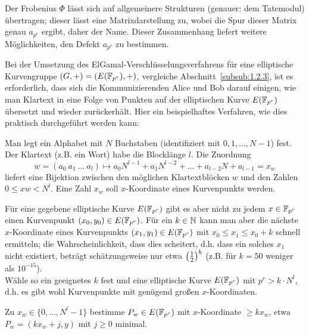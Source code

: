 \begin{bem}
	Der Frobenius $\Phi$ lässt sich auf allgemeinere Strukturen (genauer: dem Tatemodul) übertragen; dieser lässt eine Matrixdarstellung zu, wobei die Spur dieser Matrix genau $a_{p^r}$ ergibt, daher der Name.
	Dieser Zusammenhang liefert weitere Möglichkeiten, den Defekt $a_{p^r}$ zu bestimmen.
\end{bem}

\begin{anw}
	Bei der Umsetzung des ElGamal-Verschlüsselungsverfahrens für eine elliptische Kurvengruppe $(G,+) = (E(\mathbb{F}_{p^r}),+)$, vergleiche Abschnitt~\ref{subsub:1.2.3}, ist es erforderlich, dass sich die Kommunizierenden Alice und Bob darauf einigen, wie man Klartext in eine Folge von Punkten auf der elliptischen Kurve $E(\mathbb{F}_{p^r})$ übersetzt und wieder zurückerhält.
	Hier ein beispielhaftes Verfahren, wie dies praktisch durchgeführt werden kann:
\end{anw}

\begin{anw}[Schritt 1]
	Man legt ein Alphabet mit $N$ Buchstaben (identifiziert mit $0,1,\dots,N-1$) fest.
	Der Klartext (z.B. ein Wort) habe die Blocklänge $l$.
	Die Zuordnung 
	\[
		w= (a_0 \ a_1 \ \dots \ a_l) \mapsto a_0 N^{l-1} + a_1 N^{l-2} + \dots + a_{l-2} N + a_{l-1} = x_w
	\]
	liefert eine Bijektion zwischen den möglichen Klartextblöcken $w$ und den Zahlen $0 \leq xw < N^l$.
	Eine Zahl $x_w$ soll $x$-Koordinate eines Kurvenpunkts werden.
\end{anw}


\begin{anw}[Schritt 2]
	Für eine gegebene elliptische Kurve $E(\mathbb{F}_{p^r})$ gibt es aber nicht zu jedem $x \in \mathbb{F}_{p^r}$ einen Kurvenpunkt $(x_0,y_0) \in E(\mathbb{F}_{p^r})$.
	Für ein $k \in \mathbb{N}$ kann man aber die nächste $x$-Koordinate eines Kurvenpunkts $(x_1,y_1) \in E(\mathbb{F}_{p^r})$ mit $x_0 \leq x_1 \leq x_0+k$ schnell ermitteln; die Wahrscheinlichkeit, dass dies scheitert, d.h. dass ein solches $x_1$ nicht existiert, beträgt schätzungsweise nur etwa $\left(\frac{1}{2}\right)^k$
	(z.B. für $k = 50$ weniger als $10^{-15}$). \\
	Wähle so ein geeignetes $k$ fest und eine elliptische Kurve $E(\mathbb{F}_{p^r})$ mit $p^r > k \cdot N^l$, d.h. es gibt wohl Kurvenpunkte mit genügend großen $x$-Koordinaten.
\end{anw}

\begin{anw}[Schritt 3]
	Zu $x_w \in \{0,\dots,N^l-1\}$ bestimme $P_w \in E(\mathbb{F}_{p^r})$ mit $x$-Koordinate $\geq kx_w$, etwa $P_w = (kx_w + j, y)$ mit $j \geq 0$ minimal.
\end{anw}

